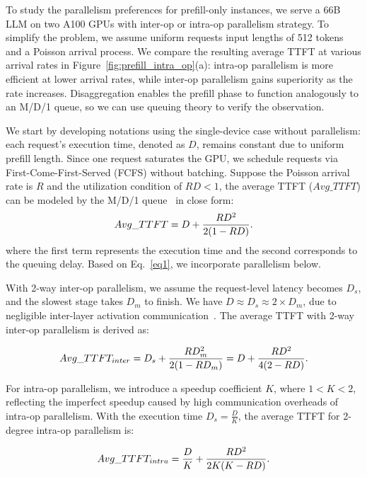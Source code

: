 To study the parallelism preferences for prefill-only instances, we serve a 66B LLM on two A100 GPUs with inter-op or intra-op parallelism strategy. To simplify the problem, we assume uniform requests input lengths of 512 tokens and a Poisson arrival process. We compare the resulting average TTFT at various arrival rates in Figure~\ref{fig:prefill_intra_op}\textcolor{green!80!black}{(a)}: intra-op parallelism is more efficient at lower arrival rates, while inter-op parallelism gains superiority as the rate increases.
Disaggregation enables the prefill phase to function analogously to an M/D/1 queue, so we can use queuing theory to verify the observation.

We start by developing notations using the single-device case without parallelism: 
each request's execution time, denoted as $D$, remains constant due to uniform prefill length. Since one request saturates the GPU, we schedule requests via First-Come-First-Served (FCFS) without batching. 
Suppose the Poisson arrival rate is $R$ and the utilization condition of $RD < 1$, the average TTFT ($Avg\_TTFT$) can be modeled by the M/D/1 queue~\cite{shortle2018fundamentals} in close form:
\begin{equation}
\small
    Avg\_TTFT = D + \frac{RD^2}{2(1-RD)}.
    \label{eq1}
\end{equation}
where the first term represents the execution time and the second corresponds to the queuing delay. 
Based on Eq.~\ref{eq1}, we incorporate parallelism below. 

With 2-way inter-op parallelism, we assume the request-level latency becomes $D_s$, and the slowest stage takes $D_m$ to finish. We have $D \approx D_s \approx 2 \times D_m$, due to negligible inter-layer activation communication~\cite{alpa,li2023alpaserve}. The average TTFT with 2-way inter-op parallelism is derived as:

\begin{equation}
\small
    Avg\_TTFT_{inter} = D_s + \frac{RD_m^2}{2(1-RD_m)} = D + \frac{RD^2}{4(2-RD)}.
    \label{eq2}
\end{equation}

For intra-op parallelism, we introduce a speedup coefficient $K$, where $1 < K < 2$, reflecting the imperfect speedup caused by high communication overheads of intra-op parallelism. 
With the execution time $D_s = \frac{D}{K}$, the average TTFT for 2-degree intra-op parallelism is:

\begin{equation}
\small
    Avg\_TTFT_{intra} = \frac{D}{K} + \frac{RD^2}{2K(K-RD)}.
    \label{eq3}
\end{equation}

